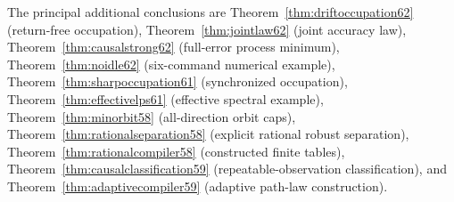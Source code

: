 \documentclass[11pt]{amsart}
\numberwithin{equation}{section}
\theoremstyle{definition}\newtheorem{definition}[theorem]{Definition}
\theoremstyle{remark}\newtheorem{remark}[theorem]{Remark}
\begin{document}
\noindent The principal additional conclusions are
Theorem~\ref{thm:driftoccupation62} (return-free occupation),
Theorem~\ref{thm:jointlaw62} (joint accuracy law),
Theorem~\ref{thm:causalstrong62} (full-error process minimum),
Theorem~\ref{thm:noidle62} (six-command numerical example),
Theorem~\ref{thm:sharpoccupation61} (synchronized occupation),
Theorem~\ref{thm:effectivelps61} (effective spectral example),
Theorem~\ref{thm:minorbit58} (all-direction orbit caps),
Theorem~\ref{thm:rationalseparation58} (explicit rational robust separation),
Theorem~\ref{thm:rationalcompiler58} (constructed finite tables),
Theorem~\ref{thm:causalclassification59} (repeatable-observation
classification), and Theorem~\ref{thm:adaptivecompiler59} (adaptive
path-law construction).





























\appendix


\end{document}

